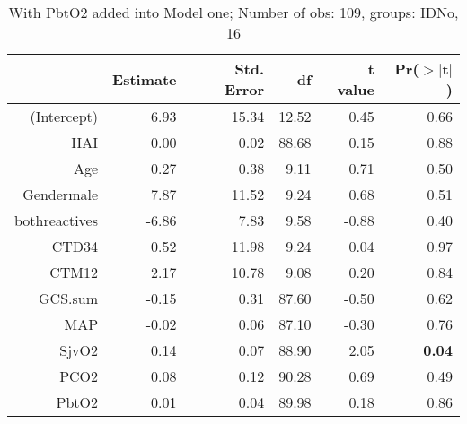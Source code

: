 \documentclass{article}
\begin{document}
\begin{table}[H]
\centering
\caption{With PbtO2 added into Model one; Number of obs: 109, groups: IDNo, 16}
\label{tab: lmm2}
\begin{tabular}{rrrrrr}
  \hline
 & Estimate & Std. Error & df & t value & Pr($>$$|$t$|$) \\ 
  \hline
(Intercept) & 6.93 & 15.34 & 12.52 & 0.45 & 0.66 \\ 
  HAI & 0.00 & 0.02 & 88.68 & 0.15 & 0.88 \\ 
  Age & 0.27 & 0.38 & 9.11 & 0.71 & 0.50 \\ 
  Gendermale & 7.87 & 11.52 & 9.24 & 0.68 & 0.51 \\ 
  bothreactives & -6.86 & 7.83 & 9.58 & -0.88 & 0.40 \\ 
  CTD34 & 0.52 & 11.98 & 9.24 & 0.04 & 0.97 \\ 
  CTM12 & 2.17 & 10.78 & 9.08 & 0.20 & 0.84 \\ 
  GCS.sum & -0.15 & 0.31 & 87.60 & -0.50 & 0.62 \\ 
  MAP & -0.02 & 0.06 & 87.10 & -0.30 & 0.76 \\ 
  SjvO2 & 0.14 & 0.07 & 88.90 & 2.05 & {\bf 0.04} \\ 
  PCO2 & 0.08 & 0.12 & 90.28 & 0.69 & 0.49 \\ 
  PbtO2 & 0.01 & 0.04 & 89.98 & 0.18 & 0.86 \\ 
   \hline
\end{tabular}
\end{table}
\end{document}
